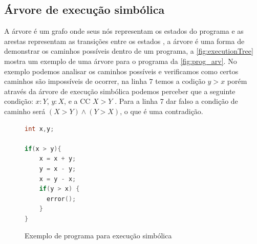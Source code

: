\subsection{Árvore de execução simbólica}
\label{sub:exec_simb_tree}
A árvore é um grafo onde seus nós representam os estados do programa e as arestas representam as transições entre os estados \cite{Khurshid:2003}, a árvore é uma forma de demonstrar os caminhos possíveis dentro de um programa, a \autoref{fig:executionTree} mostra um exemplo de uma árvore para o programa da \autoref{fig:prog_arv}.  No exemplo podemos analisar os caminhos possíveis e verificamos como certos caminhos são impossíveis de ocorrer, na linha 7 temos a codição $y > x$ porém através da árvore de execução simbólica podemos perceber que a seguinte condição:  $x:Y$, $y:X$, e a CC $X>Y$ . Para a linha 7 dar falso a condição de caminho será $(X>Y) \land (Y>X)$, o que é uma contradição.

\begin{figure}[thp]
	\caption{\label{fig:prog_arv} Exemplo de programa para execução simbólica}
	\begin{center}
    \begin{minipage}{0.6\textwidth}
    \begin{lstlisting}[language=C]       
int x,y;
  
if(x > y){
    x = x + y;
    y = x - y;
    x = y - x;
    if(y > x) {
  	  error();
    }
}
	\end{lstlisting}
    \end{minipage}
	\end{center}
\end{figure}

